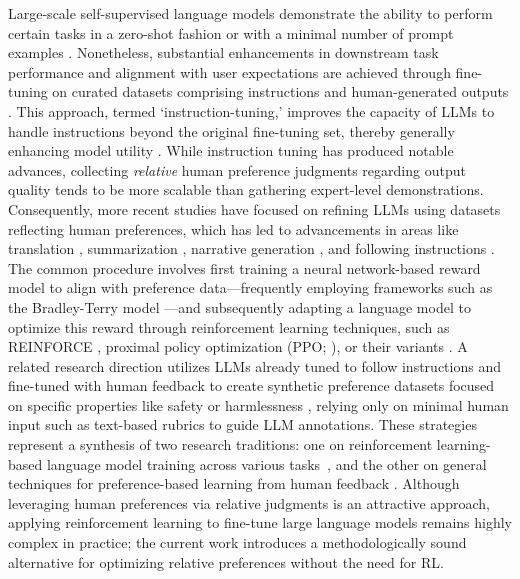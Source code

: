 Large-scale self-supervised language models demonstrate the ability to perform certain tasks in a zero-shot fashion \citep{radford2019language} or with a minimal number of prompt examples \citep{gpt3,megatron,chowdhery2022palm}. Nonetheless, substantial enhancements in downstream task performance and alignment with user expectations are achieved through fine-tuning on curated datasets comprising instructions and human-generated outputs \citep{mishra-etal-2022-cross,sanh2022multitask,chung2022scaling,thoppilan2022lamda}. This approach, termed `instruction-tuning,' improves the capacity of LLMs to handle instructions beyond the original fine-tuning set, thereby generally enhancing model utility \citep{chung2022scaling}. While instruction tuning has produced notable advances, collecting \textit{relative} human preference judgments regarding output quality tends to be more scalable than gathering expert-level demonstrations. Consequently, more recent studies have focused on refining LLMs using datasets reflecting human preferences, which has led to advancements in areas like translation \citep{kreutzer-etal-2018-reliability}, summarization \citep{stiennon2022learning,ziegler2020finetuning}, narrative generation \citep{ziegler2020finetuning}, and following instructions \citep{ouyang2022training,ramamurthy2023is}. The common procedure involves first training a neural network-based reward model to align with preference data—frequently employing frameworks such as the Bradley-Terry model \citep{bradley1952rankanalysis}—and subsequently adapting a language model to optimize this reward through reinforcement learning techniques, such as REINFORCE \citep{williams1992reinforce}, proximal policy optimization (PPO; \cite{schulman2017proximal}), or their variants \citep{ramamurthy2023is}. A related research direction utilizes LLMs already tuned to follow instructions and fine-tuned with human feedback to create synthetic preference datasets focused on specific properties like safety or harmlessness \citep{bai2022constitutional}, relying only on minimal human input such as text-based rubrics to guide LLM annotations. These strategies represent a synthesis of two research traditions: one on reinforcement learning-based language model training across various tasks~\citep{Ranzato2015SequenceLT,paulus2018a,wu2018learning}, and the other on general techniques for preference-based learning from human feedback \citep{christiano2017deep,kupcsik2018learning}. Although leveraging human preferences via relative judgments is an attractive approach, applying reinforcement learning to fine-tune large language models remains highly complex in practice; the current work introduces a methodologically sound alternative for optimizing relative preferences without the need for RL.

